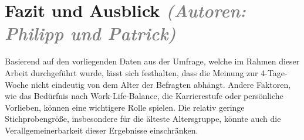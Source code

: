 \chapter{Fazit und Ausblick \textit{\textcolor{gray}{(Autoren: Philipp und Patrick)}}}


Basierend auf den vorliegenden Daten aus der Umfrage, welche im Rahmen dieser Arbeit durchgeführt wurde, 
lässt sich festhalten, dass die Meinung zur 4-Tage-Woche nicht eindeutig von dem Alter der Befragten abhängt. 
Andere Faktoren, wie das Bedürfnis nach Work-Life-Balance, die Karrierestufe oder persönliche Vorlieben, 
können eine wichtigere Rolle spielen. Die relativ geringe Stichprobengröße, insbesondere für die älteste 
Altersgruppe, könnte auch die Verallgemeinerbarkeit dieser Ergebnisse einschränken.

